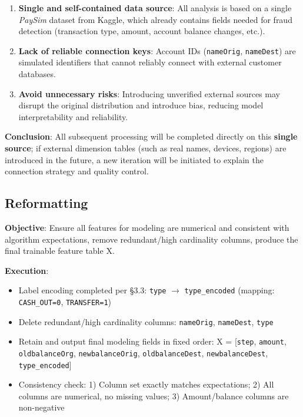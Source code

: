 \documentclass[sigplan,screen]{acmart}
\begin{document}
\begin{enumerate}
    \item \textbf{Single and self-contained data source}: All analysis is based on a single \textit{PaySim} dataset from Kaggle, which already contains fields needed for fraud detection (transaction type, amount, account balance changes, etc.).
    \item \textbf{Lack of reliable connection keys}: Account IDs (\texttt{nameOrig}, \texttt{nameDest}) are simulated identifiers that cannot reliably connect with external customer databases.
    \item \textbf{Avoid unnecessary risks}: Introducing unverified external sources may disrupt the original distribution and introduce bias, reducing model interpretability and reliability.
\end{enumerate}

\textbf{Conclusion}: All subsequent processing will be completed directly on this \textbf{single source}; if external dimension tables (such as real names, devices, regions) are introduced in the future, a new iteration will be initiated to explain the connection strategy and quality control.

\subsection{Reformatting}

\textbf{Objective}: Ensure all features for modeling are numerical and consistent with algorithm expectations, remove redundant/high cardinality columns, produce the final trainable feature table X.

\textbf{Execution}:

    \begin{itemize}
    \item Label encoding completed per \S3.3: \texttt{type} $\rightarrow$ \texttt{type\_encoded} (mapping: \texttt{CASH\_OUT=0}, \texttt{TRANSFER=1})
    \item Delete redundant/high cardinality columns: \texttt{nameOrig}, \texttt{nameDest}, \texttt{type}
    \item Retain and output final modeling fields in fixed order: X = [\texttt{step}, \texttt{amount}, \texttt{oldbalanceOrg}, \texttt{newbalanceOrig}, \texttt{oldbalanceDest}, \texttt{newbalanceDest}, \texttt{type\_encoded}]
    \item Consistency check: 1) Column set exactly matches expectations; 2) All columns are numerical, no missing values; 3) Amount/balance columns are non-negative
    \end{itemize}
    
\end{document}
